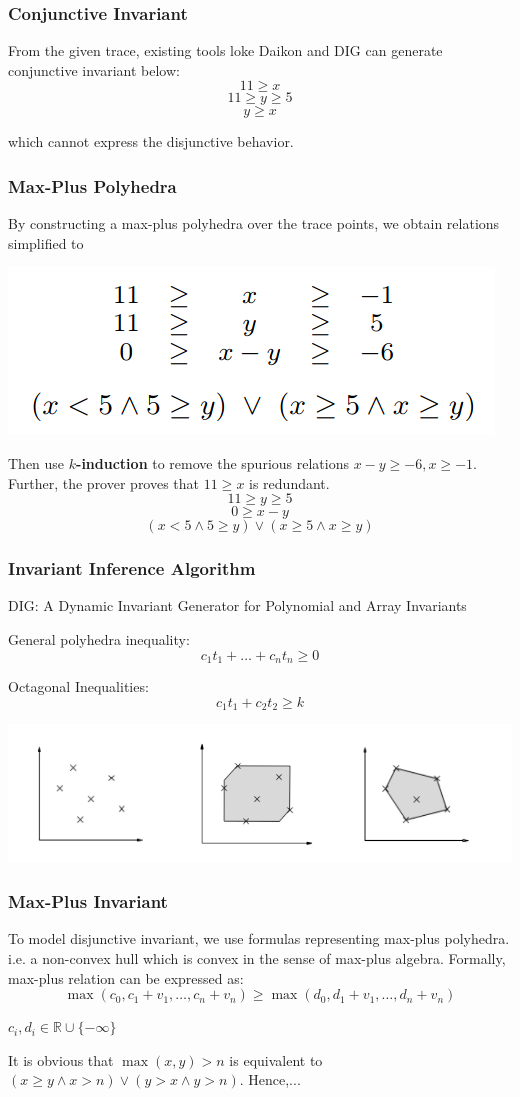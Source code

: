 \documentclass[11pt]{beamer}
\begin{document}
\begin{frame}\frametitle{Conjunctive Invariant}
From the given trace, existing tools loke Daikon and DIG can generate conjunctive invariant below:
\[11\ge x\]\[11 \ge y \ge 5\]\[y \ge x\]

which cannot express the disjunctive behavior.
\end{frame}

\begin{frame}\frametitle{Max-Plus Polyhedra}
By constructing a max-plus polyhedra over the trace points, we obtain relations simplified to 
\begin{center}
\includegraphics[scale=0.4]{2.png}
\end{center}
Then use $k$\textbf{-induction} to remove the spurious relations $x - y \ge -6, x \ge -1$. Further, the prover proves that $11 \ge x$ is redundant.
\[11 \ge y  \ge 5\]
\[0 \ge x - y\]
\[(x < 5 \wedge 5 \ge y)\vee(x \ge 5 \wedge x \ge y)\]
\end{frame}

\begin{frame}\frametitle{Invariant Inference Algorithm}
DIG: A Dynamic Invariant Generator for Polynomial and Array Invariants

General polyhedra inequality:
\[c_1t_1+\ldots + c_nt_n \ge 0\]

Octagonal Inequalities:
\[c_1t_1 + c_2t_2 \ge k\]



\begin{center}
\includegraphics[scale=0.3]{10.png}
\end{center}
\end{frame}

\begin{frame}\frametitle{Max-Plus Invariant}
To model disjunctive invariant, we use formulas representing max-plus polyhedra. i.e. a non-convex hull which is convex in the sense of max-plus algebra. Formally, max-plus relation can be expressed as:
\[\max(c_0, c_1 + v_1, \ldots, c_n + v_n) \ge \max(d_0, d_1 + v_1, \ldots, d_n + v_n)\]

$c_i, d_i\in \mathbb{R} \cup \{-\infty\}$

It is obvious that $\max(x, y) > n$ is equivalent to $(x \ge y \wedge x > n )\vee (y > x \wedge y > n)$. Hence,...
\end{frame}
\end{document}
